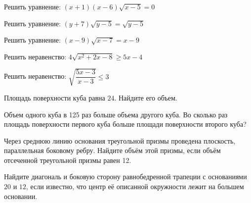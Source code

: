 \begin{homework}[number=1]
	\begin{listofex}
		\item Решить уравнение: \( (x+1)(x-6)\sqrt{x-5}=0 \)
		\item Решить уравнение: \( (y+7)\sqrt{y-5}=\sqrt{y-5}\)
		\item Решить уравнение: \( (x-9)\sqrt{x-7}=x-9\)
		\item Решить неравенство: \( 4\sqrt{x^2+2x-8}\ge 5x-4 \)
		\item Решить неравенство: \( \sqrt{\dfrac{5x-3}{x-3}}\le3 \)
		\item Площадь поверхности куба равна \( 24 \). Найдите его объем.
		\item Объем одного куба в 125 раз больше объема другого куба. Во сколько раз площадь поверхности первого куба больше площади поверхности второго куба?
		\item Через среднюю линию основания треугольной призмы проведена плоскость, параллельная боковому ребру. Найдите объём этой призмы, если объём отсеченной треугольной призмы равен 12.
		\item Найдите диагональ и боковую сторону равнобедренной трапеции с основаниями \( 20 \) и \( 12 \), если известно,
		что центр её описанной окружности лежит на большем основании.


\end{listofex}
\end{homework}
